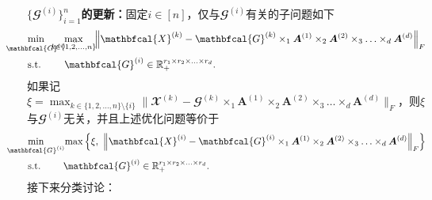 \textbf{$\{\mathbfcal{G}^{(i)}\}_{i=1}^{n}$的更新：}固定$i\in[n]$，仅与$\mathbfcal{G}^{(i)}$有关的子问题如下
\begin{equation*}
    \begin{aligned}
        &\underset{\mathclap{\mathbfcal{G}^{(i)}}}{\min} \quad &&\underset{\mathclap{k\in\{1,2,\ldots,n\}}}{\max}\quad \left\|\mathbfcal{X}^{(k)}-\mathbfcal{G}^{(k)} \times_{1} \boldsymbol{A}^{(1)} \times_{2} \boldsymbol{A}^{(2)}\times_{3} \ldots \times_{d} \boldsymbol{A}^{(d)}\right\|_{F}  \\
        &\text{s.t.} && \mathbfcal{G}^{(i)}\in\mathbb{R}_{+}^{r_1 \times r_2 \times \ldots \times r_d}.
    \end{aligned}
\end{equation*}
如果记$\xi=\max_{k\in\{1,2,\ldots,n\}\setminus\{i\}} \|\mathbfcal{X}^{(k)}-\mathbfcal{G}^{(k)} \times_{1} \boldsymbol{A}^{(1)} \times_{2} \boldsymbol{A}^{(2)}\times_{3} \ldots \times_{d} \boldsymbol{A}^{(d)}\|_{F}$，则$\xi$与$\mathbfcal{G}^{(i)}$无关，并且上述优化问题等价于
\begin{equation*}
    \begin{aligned}
        &\underset{\mathclap{\mathbfcal{G}^{(i)}}}{\min} \quad &&\max\left\{\xi,~\left\|\mathbfcal{X}^{(i)}-\mathbfcal{G}^{(i)} \times_{1} \boldsymbol{A}^{(1)} \times_{2} \boldsymbol{A}^{(2)}\times_{3} \ldots \times_{d} \boldsymbol{A}^{(d)}\right\|_{F}\right\} \\
        &\text{s.t.} && \mathbfcal{G}^{(i)}\in\mathbb{R}_{+}^{r_1 \times r_2 \times \ldots \times r_d}.
    \end{aligned}
\end{equation*}
接下来分类讨论：
